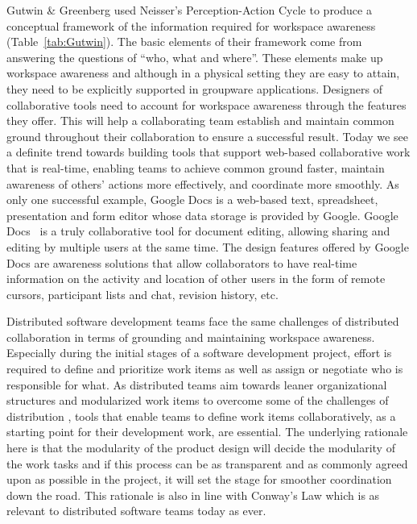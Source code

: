 \documentclass[conference]{IEEEtran}
\begin{document}
Gutwin \& Greenberg \cite{GG02} used Neisser's Perception-Action Cycle to produce a conceptual framework of the information required for workspace awareness (Table~\ref{tab:Gutwin}). The basic elements of their framework come from answering the questions of ``who, what and where''. These elements make up workspace awareness and although in a physical setting they are easy to attain, they need to be explicitly supported in groupware applications. Designers of collaborative tools need to account for workspace awareness through the features they offer. This will help a collaborating team establish and maintain common ground throughout their collaboration to ensure a successful result.
Today we see a definite trend towards building tools that support web-based collaborative work that is real-time, enabling teams to achieve common ground faster, maintain awareness of others' actions more effectively, and coordinate more smoothly. As only one successful example, Google Docs is a web-based text, spreadsheet, presentation and form editor whose data storage is provided by Google. Google Docs~\cite{SIRM07} is a truly collaborative tool for document editing, allowing sharing and editing by multiple users at the same time. The design features offered by Google Docs are awareness solutions that allow collaborators to have real-time information on the activity and location of other users in the form of remote cursors, participant lists and chat, revision history, etc.

Distributed software development teams face the same challenges of distributed collaboration in terms of grounding and maintaining workspace awareness. Especially during the initial stages of a software development project, effort is required to define and prioritize work items as well as assign or negotiate who is responsible for what. As distributed teams aim towards leaner organizational structures and modularized work items to overcome some of the challenges of distribution \cite{Herbsleb07, HG99, Parnas72}, tools that enable teams to define work items collaboratively, as a starting point for their development work, are essential. The underlying rationale here is that the modularity of the product design will decide the modularity of the work tasks and if this process can be as transparent and as commonly agreed upon as possible in the project, it will set the stage for smoother coordination down the road. This rationale is also in line with Conway's Law \cite{Conway68} which is as relevant to distributed software teams today as ever.
\end{document}
